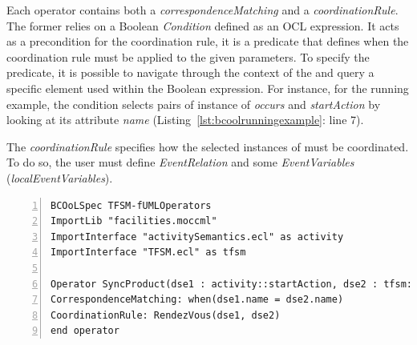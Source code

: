 
Each operator contains both a \emph{correspondenceMatching} and a \emph{coordinationRule}. The former relies on a Boolean \emph{Condition} defined as an OCL expression. It acts as a precondition for the coordination rule, \ie it is a predicate that defines when the coordination rule must be applied to the given parameters. To specify the predicate, it is possible to navigate through the context of the \dse and query a specific element used within the Boolean expression. For instance, for the running example, the condition selects pairs of instance of \dse \emph{occurs} and \emph{startAction} by looking at its attribute \emph{name} (Listing~\ref{lst:bcoolrunningexample}: line 7). %

The \emph{coordinationRule} specifies how the selected instances of \dse must be coordinated. To do so, the user must define \emph{EventRelation} and some \emph{EventVariables} (\emph{localEventVariables}).

\begin{lstlisting}[language=bcool,
caption={Synchronized product operator between the TFSM and Activity languages},
label={lst:bcoolrunningexample}, 
basicstyle=\scriptsize\ttfamily, backgroundcolor=\color{LGrey}, numbers=left, xleftmargin=2pt]
BCOoLSpec TFSM-fUMLOperators
ImportLib "facilities.moccml"
ImportInterface "activitySemantics.ecl" as activity
ImportInterface "TFSM.ecl" as tfsm

Operator SyncProduct(dse1 : activity::startAction, dse2 : tfsm::occurs)
CorrespondenceMatching: when(dse1.name = dse2.name)
CoordinationRule: RendezVous(dse1, dse2)
end operator
\end{lstlisting}

